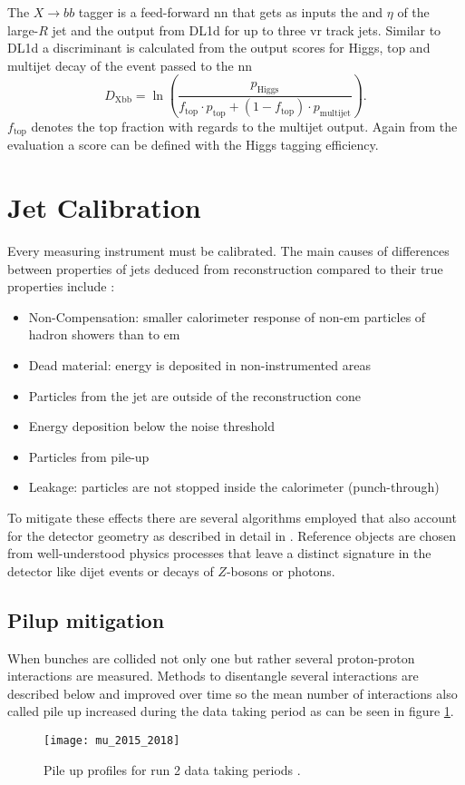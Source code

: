 The $X\rightarrow bb$ tagger is a feed-forward \ac{nn} \citep{ATL-PHYS-PUB-2020-019} that gets as inputs the \pt and $\eta$ of the large-$R$ jet and the output from DL1d for up to three \ac{vr} track jets. Similar to DL1d a discriminant is calculated from the output scores for Higgs, top and multijet decay of the event passed to the \ac{nn}
\begin{equation}
  D_{\text{Xbb}}=\ln\left({\frac{p_{\text{Higgs}}}{f_{\text{top}}\cdot p_{\text{top}}+(1-f_{\text{top}})\cdot p_{\text{multijet}}}}\right).
\end{equation}
$f_\text{top}$ denotes the top fraction with regards to the multijet output. Again from the evaluation a score can be defined with the Higgs tagging efficiency.

\section{Jet Calibration}\label{sec:calibration}
Every measuring instrument must be calibrated. The main causes of differences between properties of jets deduced from reconstruction compared to their true properties include \citep{atlas2011jet}:
\begin{itemize}
  \item Non-Compensation: smaller calorimeter response of non-\ac{em} particles of hadron showers than to \ac{em}
  \item Dead material: energy is deposited in non-instrumented areas
  \item Particles from the jet are outside of the reconstruction cone
  \item Energy deposition below the noise threshold
  \item Particles from pile-up
  \item Leakage: particles are not stopped inside the calorimeter (punch-through)
\end{itemize}
To mitigate these effects there are several algorithms employed that also account for the detector geometry as described in detail in \citep{atlas2021jet}. Reference objects are chosen from well-understood physics processes that leave a distinct signature in the detector like dijet events or decays of $Z$-bosons or photons.

\subsection{Pilup mitigation}
When bunches are collided not only one but rather several proton-proton interactions are measured. Methods to disentangle several interactions are described below and improved over time so the mean number of interactions also called pile up increased during the data taking period as can be seen in figure \ref{fig:pileup}.
\begin{figure}
  \centering
  \texttt{[image: mu\_2015\_2018]}
  \caption[]{Pile up profiles for run 2 data taking periods \citep{pileup}.}
  \label{fig:pileup}
\end{figure}

